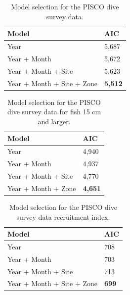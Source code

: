 \documentclass[12pt,]{article}
\begin{document}
\begin{table}[ht]
\centering
\caption{Model selection for the PISCO dive survey data.} 
\label{tab:Fleet8_AIC}
\begin{tabular}{ll}
  \hline
Model & AIC \\ 
  \hline
Year & 5,687 \\ 
  Year + Month & 5,672 \\ 
  Year + Month + Site & 5,623 \\ 
  Year + Month + Site + Zone & \textbf{5,512} \\ 
   \hline
\end{tabular}
\end{table}

\clearpage
\newpage

\vspace{3cm}

\begin{table}[ht]
\centering
\caption{Model selection for the PISCO dive survey data for fish 15 cm and larger.} 
\label{tab:Fleet8large_AIC}
\begin{tabular}{ll}
  \hline
Model & AIC \\ 
  \hline
Year & 4,940 \\ 
  Year + Month & 4,937 \\ 
  Year + Month + Site & 4,770 \\ 
  Year + Month + Zone & \textbf{4,651} \\ 
   \hline
\end{tabular}
\end{table}

\vspace{3cm}

\begin{table}[ht]
\centering
\caption{Model selection for the PISCO dive survey data recruitment index.} 
\label{tab:Fleet8age0_AIC}
\begin{tabular}{ll}
  \hline
Model & AIC \\ 
  \hline
Year & 708 \\ 
  Year + Month & 703 \\ 
  Year + Month + Site & 713 \\ 
  Year + Month + Site + Zone & \textbf{699} \\ 
   \hline
\end{tabular}
\end{table}

\FloatBarrier
\end{document}

